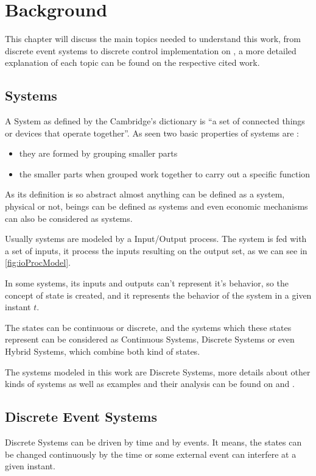 
\chapter{Background}
\label{cha:background}
This chapter will discuss the main topics needed to understand this work, from
discrete event systems to discrete control implementation on \PLCs, a more
detailed explanation of each topic can be found on the respective cited work.
\section{Systems}

A System as defined by the Cambridge's dictionary is ``a set of connected
things or devices that operate together''. As seen two basic properties
of systems
are :
\begin{itemize}
\item they are formed by grouping smaller parts
\item the smaller parts when grouped work together to carry out a specific function
\end{itemize}

As its definition is so abstract almost anything can be defined as a system,
physical or not, beings can be defined as systems and even economic mechanisms
can also be considered as systems.

Usually systems are modeled by a Input/Output process. The system is fed with a
set of inputs, it process the inputs resulting on the output set, as we can see in  \autoref{fig:ioProcModel}. 


In some systems, its inputs and outputs can't represent it's behavior, so
the concept of state is created, and it represents the behavior of the system in
a given instant $t$.

The states can be continuous or discrete, and the systems which these states
represent can be considered as Continuous Systems, Discrete Systems or even
Hybrid Systems, which combine both kind of states.

The systems modeled in this work are Discrete Systems, more details about other
kinds of systems as well as examples and their analysis can be found on \cite{oppenheim1996signals}
and \cite{kalouptsidis1997signal}.
\section{Discrete Event Systems}
\label{sec:discreteEventSystems}
Discrete Systems can be driven by time and by events. It means, the states can
be changed continuously by the time or some external event can interfere at a
given instant. 

